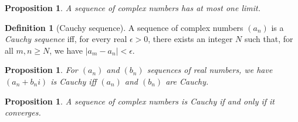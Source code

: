 \documentclass{article}
\newtheorem{proposition}[axiom]{Proposition}
\theoremstyle{definition}
\newtheorem{definition}[axiom]{Definition}
\begin{document}
\begin{proposition}
    A sequence of complex numbers has at most one limit.
\end{proposition}

\begin{definition}[Cauchy sequence]
    A sequence of complex numbers $(a_n)$ is a \emph{Cauchy sequence} iff,
    for every real $\epsilon > 0$, there exists an integer $N$ such that,
    for all $m,n \geq N$, we have $|a_m - a_n| < \epsilon$.
\end{definition}

\begin{proposition}
    For $(a_n)$ and $(b_n)$ sequences of real numbers, we have $(a_n + b_ni)$
    is Cauchy iff $(a_n)$ and $(b_n)$ are Cauchy.
\end{proposition}

\begin{proposition}
    A sequence of complex numbers is Cauchy if and only if it converges.
\end{proposition}
\end{document}
